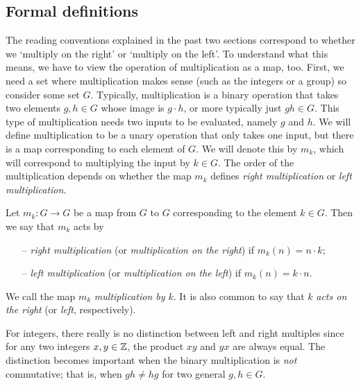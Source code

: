 \subsection{Formal definitions}

The reading conventions explained in the past two sections correspond to whether we `multiply on the right' or `multiply on the left'. To understand what this means, we have to view the operation of multiplication as a map, too. First, we need a set where multiplication makes sense (such as the integers or a group) so consider some set $G$. Typically, multiplication is a binary operation that takes two elements $g, h \in G$ whose image is $g \cdot h$, or more typically just $gh \in G$. This type of multiplication needs two inputs to be evaluated, namely $g$ and $h$. We will define multiplication to be a unary operation that only takes one input, but there is a map corresponding to each element of $G$. We will denote this by $m_{k}$, which will correspond to multiplying the input by $k \in G$. The order of the multiplication depends on whether the map $m_{k}$ defines \textit{right multiplication} or \textit{left multiplication}.

\begin{definition}[(Multiplication)]
    Let $m_{k} \colon G \to G$ be a map from $G$ to $G$ corresponding to the element $k \in G$. Then we say that $m_{k}$ acts by
    \vspace*{-10pt}
    \begin{itemize}[nolistsep]
        \item[--] \textit{right multiplication} (or \textit{multiplication on the right}) if $m_{k}(n) = n \cdot k$;
        \item[--] \textit{left multiplication} (or \textit{multiplication on the left}) if $m_{k}(n) = k \cdot n$.
    \end{itemize}
    \vspace*{-10pt}
    We call the map $m_{k}$ \textit{multiplication by $k$}. It is also common to say that $k$ \textit{acts on the right} (or \textit{left}, respectively).
\end{definition}

For integers, there really is no distinction between left and right multiples since for any two integers $x, y \in \mathbb{Z}$, the product $xy$ and $yx$ are always equal. The distinction becomes important when the binary multiplication is \textit{not} commutative; that is, when $gh \neq hg$ for two general $g, h \in G$. %

